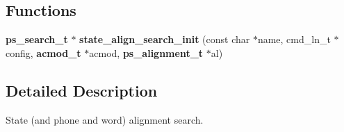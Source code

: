 \subsection*{Functions}
\begin{DoxyCompactItemize}
\item 
{\bf ps\+\_\+search\+\_\+t} $\ast$ {\bfseries state\+\_\+align\+\_\+search\+\_\+init} (const char $\ast$name, cmd\+\_\+ln\+\_\+t $\ast$config, {\bf acmod\+\_\+t} $\ast$acmod, {\bf ps\+\_\+alignment\+\_\+t} $\ast$al)\label{state__align__search_8h_a037465636cb9d40dd1ebc1e04c0fd633}

\end{DoxyCompactItemize}


\subsection{Detailed Description}
State (and phone and word) alignment search. 

